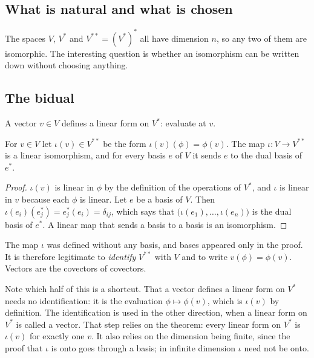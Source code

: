 \begin{notechapter}
\section{What is natural and what is chosen}\label{duality:sec:bidual}

The spaces $V$, $V^*$ and $V^{**} = (V^*)^*$ all have dimension $n$, so any
two of them are isomorphic. The interesting question is whether an
isomorphism can be written down without choosing anything.

\subsection{The bidual}

A vector $v\in V$ defines a linear form on $V^*$: evaluate at $v$.

\begin{theorem}
\label{duality:thm:bidual}
For $v\in V$ let $\iota(v)\in V^{**}$ be the form
$\iota(v)(\phi) = \phi(v)$. The map $\iota:V\to V^{**}$ is a linear
isomorphism, and for every basis $e$ of $V$ it sends $e$ to the dual basis
of $e^*$.
\end{theorem}

\begin{proof}
$\iota(v)$ is linear in $\phi$ by the definition of the operations of
$V^*$, and $\iota$ is linear in $v$ because each $\phi$ is linear. Let $e$
be a basis of $V$. Then $\iota(e_i)(e_j^*) = e_j^*(e_i) = \delta_{ij}$,
which says that $\bigl(\iota(e_1),\dots,\iota(e_n)\bigr)$ is the dual
basis of $e^*$. A linear map that sends a basis to a basis is an
isomorphism.
\end{proof}

The map $\iota$ was defined without any basis, and bases appeared only in
the proof. It is therefore legitimate to \emph{identify} $V^{**}$ with $V$
and to write $v(\phi) = \phi(v)$. Vectors are the covectors of covectors.

Note which half of this is a shortcut. That a vector defines a linear
form on $V^*$ needs no identification: it is the evaluation
$\phi\mapsto\phi(v)$, which is $\iota(v)$ by definition. The
identification is used in the other direction, when a linear form on
$V^*$ is called a vector. That step relies on the theorem: every linear
form on $V^*$ is $\iota(v)$ for exactly one $v$. It also relies on the
dimension being finite, since the proof that $\iota$ is onto goes
through a basis; in infinite dimension $\iota$ need not be onto.


\end{notechapter}
